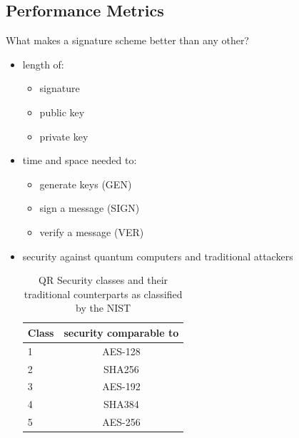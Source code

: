 \documentclass[ucs,10pt]{beamer}
\begin{document}
\subsection{Performance Metrics}
\begin{frame}{What makes a signature scheme better than any other?}

  \begin{itemize}
  \item length of:
  \begin{itemize}
    \item signature
    \item public key
    \item private key
  \end{itemize}
    \item time and space needed to:
    \begin{itemize}
      \item generate keys (GEN)
      \item sign a message (SIGN)
      \item verify a message (VER)
    \end{itemize}
  \item security against quantum computers and traditional attackers
  \begin{table}
    \label{QR-classes}
    \centering
    \caption{QR Security classes and their traditional counterparts as classified by the NIST}
    \begin{tabular}{|l | c|}
        \hline
        Class & security comparable to \\
        \hline
        1 & AES-128 \\
        2 & SHA256 \\
        3 & AES-192 \\
        4 & SHA384 \\
        5 & AES-256 \\
        \hline
    \end{tabular} 
\end{table}
\end{itemize}
\end{frame}
\end{document}
